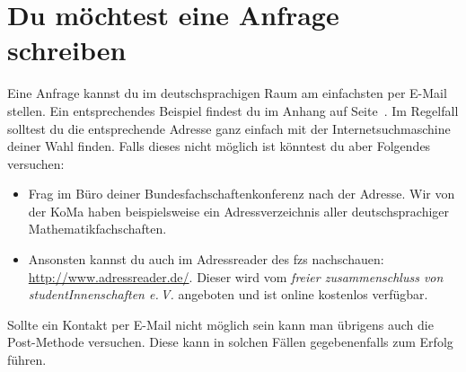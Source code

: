 \section{Du möchtest eine Anfrage schreiben}\label{sec:anfrage}
Eine Anfrage kannst du im deutschsprachigen Raum am einfachsten per E-Mail stellen. Ein entsprechendes Beispiel findest du im Anhang auf Seite~\pageref{sec:musteranfrage}. Im Regelfall solltest du die entsprechende Adresse ganz einfach mit der Internetsuchmaschine deiner Wahl finden. Falls dieses nicht möglich ist könntest du aber Folgendes versuchen:
\begin{itemize}
    \item Frag im Büro deiner Bundesfachschaftenkonferenz nach der Adresse. Wir von der KoMa haben beispielsweise ein Adressverzeichnis aller deutschsprachiger Mathematikfachschaften.
    \item Ansonsten kannst du auch im Adressreader des fzs nachschauen: \url{http://www.adressreader.de/}. Dieser wird vom \emph{freier zusammenschluss von studentInnenschaften e.\,V.} angeboten und ist online kostenlos verfügbar.
\end{itemize}
Sollte ein Kontakt per E-Mail nicht möglich sein kann man übrigens auch die Post-Methode versuchen. Diese kann in solchen Fällen gegebenenfalls zum Erfolg führen.


